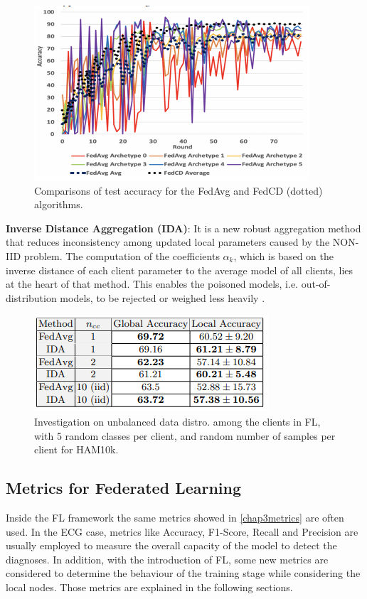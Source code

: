 \begin{figure}[H]
\centering
\includegraphics[scale=0.8]{img/fl21_fedCD.PNG}
\caption{Comparisons of test accuracy for the FedAvg and FedCD (dotted)
algorithms. \cite{fl21}}
\label{fig:fl21_fedCD}
\end{figure}

\textbf{Inverse Distance Aggregation (IDA)}: It is a new robust aggregation method that reduces inconsistency among updated local parameters caused by the NON-IID problem. The computation of the coefficients $\alpha_k$, which is based on the inverse distance of each client parameter to the average model of all clients, lies at the heart of that method. This enables the poisoned models, i.e. out-of-distribution models, to be rejected or weighed less heavily \cite{fl22}.

\begin{figure}[H]
\centering
\includegraphics[scale=0.9]{img/fl22_IDA.PNG}
\caption{Investigation on unbalanced data distro. among the clients in FL, with 5 random classes per client, and random number of samples per client for HAM10k. \cite{fl22}}
\label{fig:fl22_IDA}
\end{figure}



\subsection{Metrics for Federated Learning}

Inside the FL framework the same metrics showed in \ref{chap3metrics} are often used. In the ECG case, metrics like Accuracy, F1-Score, Recall and Precision are usually employed to measure the overall capacity of the model to detect the diagnoses. In addition, with the introduction of FL, some new metrics are considered to determine the behaviour of the training stage while considering the local nodes. Those metrics are explained in the following sections.

